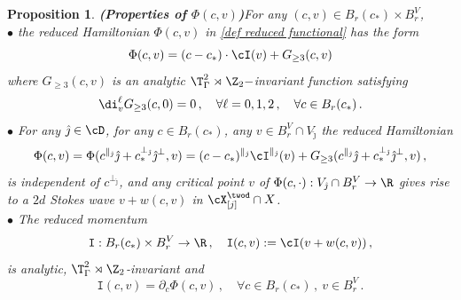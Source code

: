 \documentclass[11pt,a4paper,reqno]{article}
\numberwithin{equation}{section}
\newtheorem{proposition}[theorem]{Proposition}
\theoremstyle{definition}
\begin{document}
    \begin{proposition}{\bf (Properties of $\Phi (c, v) $)}\label{lem:expa}
    For any $(c,v)\in B_{r}(c_*)\times B_{r}^V $, 
\\[1mm]
    $ \bullet $    the reduced Hamiltonian $\Phi(c,v)$ in \eqref{def reduced functional} has the form
        \begin{equation}\label{exp1Phi}
            \Phi(c,v)=(c-c_*)\cdot \cI(v)+G_{\geq 3}(c,v)
        \end{equation}
        where    
        $G_{\geq 3}(c,v) $ is an analytic $\T^2_\Gamma\rtimes \Z_2-$invariant function 
        satisfying 
\begin{equation}\label{Gprgeq3}
\di_v^\ell G_{\geq 3} (c,0) = 0 \, , \quad 
\forall \ell = 0,1,2\, , \quad \forall c \in B_r (c_*) \, . 
\end{equation}
  $ \bullet $       For any $ {\hat \jmath} \in \cD $, 
        for any $ c \in B_{r}(c_*)  $, 
        any $ v \in B_{r}^V \cap V_{\hat \jmath}$
        the reduced Hamiltonian 
        \begin{equation}
        \label{Phi is independent on c2Q if v is in V2dj}
            \Phi(c,v) 
        =    \Phi(c^{\parallel_{\hat \jmath}} 
        \hat\jmath+c^{\bot_{\hat \jmath}}_* \hat\jmath^\bot ,v) =
        (c-c_*)^{\parallel_{\hat \jmath}} \cI^{\parallel_{\hat \jmath}} (v) + G_{\geq 3} (c^{\parallel_{\hat \jmath}} \hat\jmath+c^{\bot_{\hat \jmath}}_* \hat\jmath^\bot, v) \, , 
        \end{equation}
        is independent of $ c^{\bot_{\hat \jmath}}$, 
and   any critical point 
$v $ of 
$ \Phi(c, \cdot) : V_{\hat \jmath} \cap B_r^V \to \R $ gives rise to a $2d$ Stokes  wave  $ v + w(c,v) $ in $ \cX^{\twod}_{[j]} \cap X $.
\\[1mm]  
   $ \bullet $     The 
    reduced momentum 
    \begin{equation}\label{eq:def I(c,v)}
  {\mathtt I} : B_{r}(c_*)\times B_{r}^V \to \R  \, , 
  \quad {\mathtt I} (c,v):=\cI(v+w(c,v)) \, , 
    \end{equation} 
is analytic, $\T^2_{\Gamma}\rtimes \Z_2$-invariant  and  
    \begin{equation}\label{partial c Phi}
        {\mathtt I} (c,v) = \partial_c\Phi(c,v)  \, , \quad \forall c \in 
        B_{r}(c_*) \, ,  \  
        v \in  B_{r}^V \,      
        . 
    \end{equation}
    \end{proposition}
    
\end{document}

